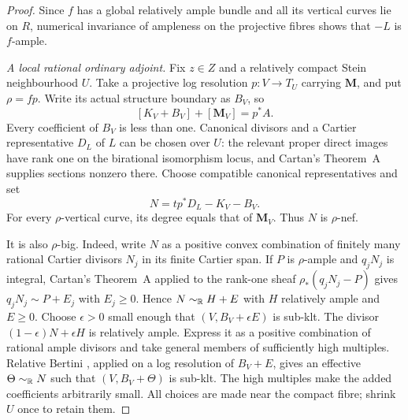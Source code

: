 \begin{proof}
Since $f$ has a global relatively ample bundle and all its vertical
curves lie on $R$, numerical invariance of ampleness on the projective
fibres shows that $-L$ is $f$-ample.

\smallskip\noindent
\emph{A local rational ordinary adjoint.}
Fix $z\in Z$ and a relatively compact Stein neighbourhood $U$.
Take a projective log resolution $p:V\to T_U$ carrying $\mathbf M$,
and put $\rho=f p$. Write its actual structure boundary as $B_V$, so
\[
 [K_V+B_V]+[\mathbf M_V]=p^*A.
\]
Every coefficient of $B_V$ is less than one. Canonical divisors and a
Cartier representative $D_L$ of $L$ can be chosen over $U$: the relevant
proper direct images have rank one on the birational isomorphism locus,
and Cartan's Theorem~A supplies sections nonzero there. Choose compatible
canonical representatives and set
\[
 N=t p^*D_L-K_V-B_V.
\]
For every $\rho$-vertical curve, its degree equals that of $\mathbf M_V$.
Thus $N$ is $\rho$-nef.

It is also $\rho$-big. Indeed, write $N$ as a positive convex combination
of finitely many rational Cartier divisors $N_j$ in its finite Cartier
span. If $P$ is $\rho$-ample and $q_jN_j$ is integral, Cartan's
Theorem~A applied to the rank-one sheaf $\rho_*(q_jN_j-P)$ gives
$q_jN_j\sim P+E_j$ with $E_j\geq0$. Hence $N\sim_{\mathbb R}H+E$ with $H$
relatively ample and $E\geq0$.
Choose $\epsilon>0$ small enough that $(V,B_V+\epsilon E)$ is sub-klt.
The divisor $(1-\epsilon)N+\epsilon H$ is relatively ample. Express it
as a positive combination of rational ample divisors and take general
members of sufficiently high multiples. Relative Bertini
\cite[Theorem~2.20]{DHP2024}, applied on a log resolution of $B_V+E$,
gives an effective $\Theta\sim_{\mathbb R}N$ such that $(V,B_V+\Theta)$ is
sub-klt. The high multiples make the added coefficients arbitrarily
small. All choices are made near the compact fibre; shrink $U$ once
to retain them.


\end{proof}
